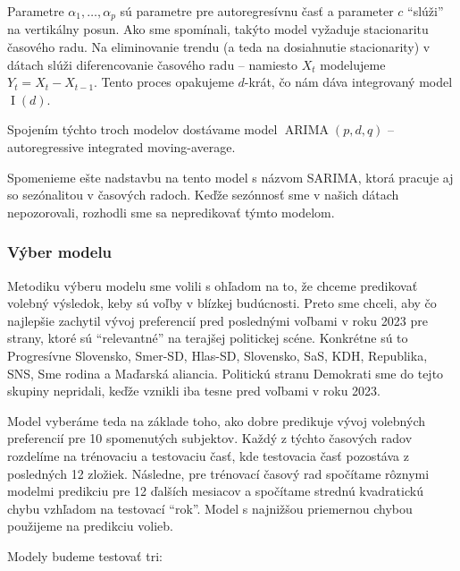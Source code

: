 \documentclass[main.tex]{subfiles}
\begin{document}
Parametre $\alpha_1,\dots,\alpha_p$ sú parametre pre autoregresívnu časť a parameter $c$ \enquote{slúži} na vertikálny posun. Ako sme spomínali, takýto model vyžaduje stacionaritu časového radu. Na eliminovanie trendu (a teda na dosiahnutie stacionarity) v dátach slúži diferencovanie časového radu -- namiesto $X_t$ modelujeme $Y_t = X_t - X_{t-1}$. Tento proces opakujeme $d$-krát, čo nám dáva integrovaný model $\operatorname{I}(d)$. 

Spojením týchto troch modelov dostávame model $\operatorname{ARIMA}(p,d,q)$ -- autoregressive integrated moving-average.

Spomenieme ešte nadstavbu na tento model s názvom SARIMA, ktorá pracuje aj so sezónalitou v časových radoch. Keďže sezónnosť sme v našich dátach nepozorovali, rozhodli sme sa nepredikovať týmto modelom. 

\subsubsection{Výber modelu}

Metodiku výberu modelu sme volili s ohľadom na to, že chceme predikovať volebný výsledok, keby sú voľby v blízkej budúcnosti. Preto sme chceli, aby čo najlepšie zachytil vývoj preferencií pred poslednými voľbami v roku 2023 pre strany, ktoré sú \enquote{relevantné} na terajšej politickej scéne. Konkrétne sú to Progresívne Slovensko, Smer-SD, Hlas-SD, Slovensko, SaS, KDH, Republika, SNS, Sme rodina a Maďarská aliancia. Politickú stranu Demokrati sme do tejto skupiny nepridali, keďže vznikli iba tesne pred voľbami v roku 2023. 

Model vyberáme teda na základe toho, ako dobre predikuje vývoj volebných preferencií pre 10 spomenutých subjektov. Každý z týchto časových radov rozdelíme na trénovaciu a testovaciu časť, kde testovacia časť pozostáva z posledných 12 zložiek. Následne, pre trénovací časový rad spočítame rôznymi modelmi predikciu pre 12 ďalších mesiacov a spočítame strednú kvadratickú chybu vzhľadom na testovací \enquote{rok}. Model s najnižšou priemernou chybou použijeme na predikciu volieb. 

Modely budeme testovať tri:
\end{document}
